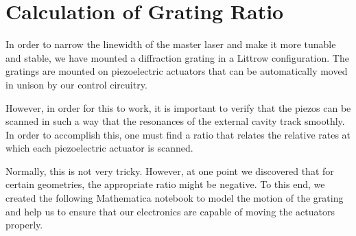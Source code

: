 \chapter{Calculation of Grating Ratio}\label{GratingRatioAppendix}
In order to narrow the linewidth of the master laser and make it more tunable and stable, we have mounted a diffraction grating in a Littrow configuration. The gratings are mounted on piezoelectric actuators that can be automatically moved in unison by our control circuitry. 

However, in order for this to work, it is important to verify that the piezos can be scanned in such a way that the resonances of the external cavity track smoothly. In order to accomplish this, one must find a ratio that relates the relative rates at which each piezoelectric actuator is scanned. 

Normally, this is not very tricky. However, at one point we discovered that for certain geometries, the appropriate ratio might be negative. To this end, we created the following Mathematica notebook to model the motion of the grating and help us to ensure that our electronics are capable of moving the actuators properly. 



